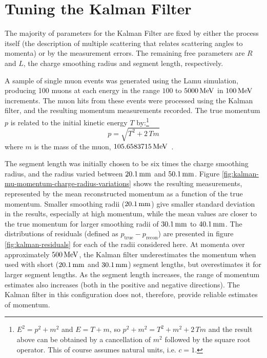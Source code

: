 \section{Tuning the Kalman Filter}\label{sec:kalman-tuning}
The majority of parameters for the Kalman Filter are fixed by either the process itself (the description of multiple scattering that relates scattering angles to momenta) or by the measurement errors. The remaining free parameters are $R$ and $L$, the charge smoothing radius and segment length, respectively.

A sample of single muon events was generated using the Lamu simulation, producing 100 muons at each energy in the range $100$ to $5000\,\mathrm{MeV}$ in $100\,\mathrm{MeV}$ increments. The muon hits from these events were processed using the Kalman filter, and the resulting momentum measurements recorded. The true momentum $p$ is related to the initial kinetic energy $T$ by:\footnote{$E^2 = p^2+m^2$ and $E = T + m$, so $p^2 + m^2 = T^2 + m^2 + 2\,T m$ and the result above can be obtained by a cancellation of $m^2$ followed by the square root operator. This of course assumes natural units, i.e. $c=1$.}
\begin{equation}\label{eqn:momentum-kinetic-energy-relationship}
p = \sqrt{T^2 + 2\,T m}
\end{equation}
where $m$ is the mass of the muon, $105.6583715\,\mathrm{MeV}$~\citep{PDG2011}.

The segment length was initially chosen to be six times the charge smoothing radius, and the radius varied between $20.1\,\mathrm{mm}$ and $50.1\,\mathrm{mm}$. Figure \ref{fig:kalman-mu-momentum-charge-radius-variations} shows the resulting measurements, represented by the mean reconstructed momentum as a function of the true momentum. Smaller smoothing radii ($20.1\,\mathrm{mm}$) give smaller standard deviation in the results, especially at high momentum, while the mean values are closer to the true momentum for larger smoothing radii of $30.1\,\mathrm{mm}$ to $40.1\,\mathrm{mm}$. The distributions of residuals (defined as $p_{\mathrm{true}} - p_{\mathrm{recon}}$) are presented in figure \ref{fig:kalman-residuals} for each of the radii considered here. At momenta over approximately $500\,\mathrm{MeV}$, the Kalman filter underestimates the momentum when used with short ($20.1\,\mathrm{mm}$ and $30.1\,\mathrm{mm}$) segment lengths, but overestimates it for larger segment lengths. As the segment length increases, the range of momentum estimates also increases (both in the positive and negative directions). The Kalman filter in this configuration does not, therefore, provide reliable estimates of momentum.

